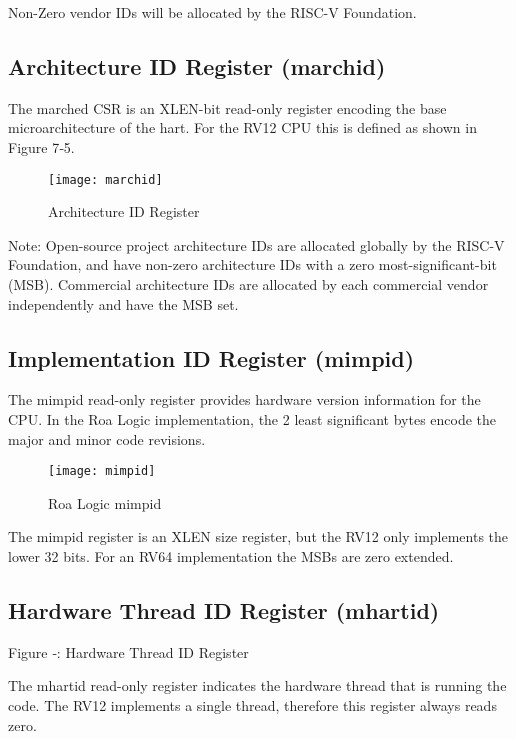 Non-Zero vendor IDs will be allocated by the RISC-V Foundation.

\subsection{Architecture ID Register
(marchid)}\label{architecture-id-register-marchid}

The marched CSR is an XLEN-bit read-only register encoding the base
microarchitecture of the hart. For the RV12 CPU this is defined as shown
in Figure 7‑5.

\begin{figure}[hbt]
  \texttt{[image: marchid]}
  \caption{Architecture ID Register}
\end{figure}

Note: Open-source project architecture IDs are allocated globally by the
RISC-V Foundation, and have non-zero architecture IDs with a zero
most-significant-bit (MSB). Commercial architecture IDs are allocated by
each commercial vendor independently and have the MSB set.

\subsection{Implementation ID Register
(mimpid)}\label{implementation-id-register-mimpid}

The mimpid read-only register provides hardware version information for
the CPU. In the Roa Logic implementation, the 2 least significant bytes
encode the major and minor code revisions.

\begin{figure}[hbt]
  \texttt{[image: mimpid]}
  \caption{Roa Logic mimpid}
\end{figure}

The mimpid register is an XLEN size register, but the RV12 only
implements the lower 32 bits. For an RV64 implementation the MSBs are
zero extended.

\subsection{Hardware Thread ID Register
(mhartid)}\label{hardware-thread-id-register-mhartid}

\missingfigure{}

Figure ‑: Hardware Thread ID Register

The mhartid read-only register indicates the hardware thread that is
running the code. The RV12 implements a single thread, therefore this
register always reads zero.

